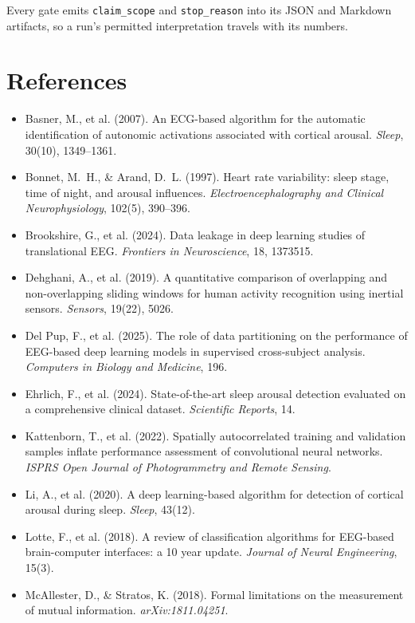 \documentclass[11pt]{article}
\begin{document}
Every gate emits \texttt{claim\_scope} and \texttt{stop\_reason} into its JSON and
Markdown artifacts, so a run's permitted interpretation travels with its numbers.

\section*{References}
\small
\begin{itemize}[leftmargin=1.2em,label={}]
\item Basner, M., et al. (2007). An ECG-based algorithm for the automatic
identification of autonomic activations associated with cortical arousal.
\emph{Sleep}, 30(10), 1349--1361.
\item Bonnet, M.~H., \& Arand, D.~L. (1997). Heart rate variability: sleep stage,
time of night, and arousal influences. \emph{Electroencephalography and Clinical
Neurophysiology}, 102(5), 390--396.
\item Brookshire, G., et al. (2024). Data leakage in deep learning studies of
translational EEG. \emph{Frontiers in Neuroscience}, 18, 1373515.
\item Dehghani, A., et al. (2019). A quantitative comparison of overlapping and
non-overlapping sliding windows for human activity recognition using inertial
sensors. \emph{Sensors}, 19(22), 5026.
\item Del Pup, F., et al. (2025). The role of data partitioning on the performance
of EEG-based deep learning models in supervised cross-subject analysis.
\emph{Computers in Biology and Medicine}, 196.
\item Ehrlich, F., et al. (2024). State-of-the-art sleep arousal detection
evaluated on a comprehensive clinical dataset. \emph{Scientific Reports}, 14.
\item Kattenborn, T., et al. (2022). Spatially autocorrelated training and
validation samples inflate performance assessment of convolutional neural
networks. \emph{ISPRS Open Journal of Photogrammetry and Remote Sensing}.
\item Li, A., et al. (2020). A deep learning-based algorithm for detection of
cortical arousal during sleep. \emph{Sleep}, 43(12).
\item Lotte, F., et al. (2018). A review of classification algorithms for
EEG-based brain-computer interfaces: a 10 year update. \emph{Journal of Neural
Engineering}, 15(3).
\item McAllester, D., \& Stratos, K. (2018). Formal limitations on the measurement
of mutual information. \emph{arXiv:1811.04251}.

\end{itemize}
\end{document}
